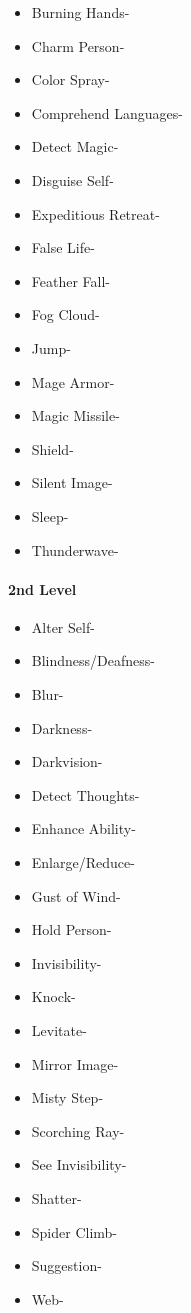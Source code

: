 \documentclass[
]{article}
\providecommand{\tightlist}{%
  \setlength{\itemsep}{0pt}\setlength{\parskip}{0pt}}
\begin{document}
\begin{itemize}
\tightlist
\item
  Burning Hands-
\item
  Charm Person-
\item
  Color Spray-
\item
  Comprehend Languages-
\item
  Detect Magic-
\item
  Disguise Self-
\item
  Expeditious Retreat-
\item
  False Life-
\item
  Feather Fall-
\item
  Fog Cloud-
\item
  Jump-
\item
  Mage Armor-
\item
  Magic Missile-
\item
  Shield-
\item
  Silent Image-
\item
  Sleep-
\item
  Thunderwave-
\end{itemize}

\hypertarget{2nd-level-5}{%
\paragraph{2nd Level}\label{2nd-level-5}}

\begin{itemize}
\tightlist
\item
  Alter Self-
\item
  Blindness/Deafness-
\item
  Blur-
\item
  Darkness-
\item
  Darkvision-
\item
  Detect Thoughts-
\item
  Enhance Ability-
\item
  Enlarge/Reduce-
\item
  Gust of Wind-
\item
  Hold Person-
\item
  Invisibility-
\item
  Knock-
\item
  Levitate-
\item
  Mirror Image-
\item
  Misty Step-
\item
  Scorching Ray-
\item
  See Invisibility-
\item
  Shatter-
\item
  Spider Climb-
\item
  Suggestion-
\item
  Web-
\end{itemize}
\end{document}
